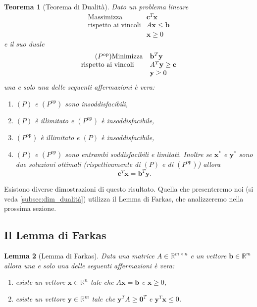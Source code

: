 \documentclass[italian, letter paper, 12pt, reqno]{article}
\theoremstyle{myteo}
\newtheorem{theorem}{Teorema}[section]
\newtheorem{lemma}[theorem]{Lemma}
\numberwithin{equation}{section}
\newcommand{\dual}[1]{#1^{\text{op}}}
\begin{document}
\begin{theorem}[Teorema di Dualità]
  \label{teo:dualità}
  Dato un problema lineare
  \begin{equation*}
    \begin{array}{ll}
      \tag{\(P\)}
      \text{Massimizza} & \mathbf{c}^T\mathbf{x}\\
      \text{rispetto ai vincoli} & A\mathbf{x} \leq \mathbf{b}\\
                        & \mathbf{x} \geq 0
    \end{array}
  \end{equation*}
  e il suo duale
  \begin{equation*}
    \begin{array}{ll}
      \tag{\(\dual{P}\)}
      \text{Minimizza} & \mathbf{b}^T\mathbf{y}\\
      \text{rispetto ai vincoli} & A^T\mathbf{y} \geq \mathbf{c}\\
                        & \mathbf{y} \geq 0
    \end{array}
  \end{equation*}
  una e solo una delle seguenti affermazioni è vera:
  \begin{enumerate}
  \item \((P)\) e \((\dual{P})\) sono insoddisfacibili,
  \item \((P)\) è illimitato e \((\dual{P})\) è insoddisfacibile,
  \item \((\dual{P})\) è illimitato e \((P)\) è insoddisfacibile,
  \item \((P)\) e \((\dual{P})\) sono entrambi soddisfacibili e limitati.
    Inoltre se \(\mathbf{x}^*\) e \(\mathbf{y}^*\) sono due soluzioni ottimali (rispettivamente di \((P)\) e di \((\dual{P})\)) allora
    \[\mathbf{c}^T\mathbf{x} = \mathbf{b}^T\mathbf{y}.\]
  \end{enumerate}
\end{theorem}

Esistono diverse dimostrazioni di questo risultato.
Quella che presenteremo noi (si veda \ref{subsec:dim_dualità}) utilizza il Lemma di Farkas, che analizzeremo nella prossima sezione.

\subsection{Il Lemma di Farkas}
\label{subsec:lemma_di_farkas}

\begin{lemma}[Lemma di Farkas]
  \label{lemma:farkas}
  Data una matrice \(A\in\mathbb{R}^{m\times n}\) e un vettore \(\mathbf{b}\in\mathbb{R}^m\) allora una e solo una delle seguenti affermazioni è vera:
  \begin{enumerate}
  \item esiste un vettore \(\mathbf{x}\in\mathbb{R}^n\) tale che \(A\mathbf{x}=\mathbf{b}\) e \(\mathbf{x} \geq 0\),
  \item esiste un vettore \(\mathbf{y}\in\mathbb{R}^m\) tale che \(\mathbf{y}^TA \geq \mathbf{0}^T\) e \(\mathbf{y}^T\mathbf{x} \leq 0\).
  \end{enumerate}
\end{lemma}
\end{document}
